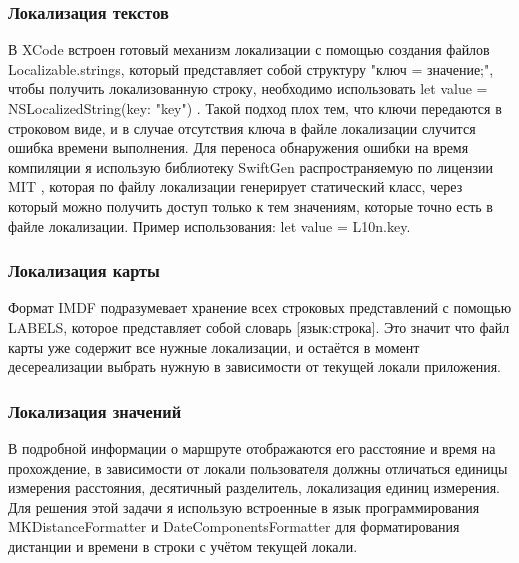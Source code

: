     \subsubsection{Локализация текстов}
      В XCode встроен готовый механизм локализации с помощью создания файлов Localizable.strings, который представляет собой структуру "ключ = значение;", чтобы получить локализованную строку, необходимо использовать let value = NSLocalizedString(key: "key") \cite{NSLocalizedString}. Такой подход плох тем, что ключи передаются в строковом виде, и в случае отсутствия ключа в файле локализации случится ошибка времени выполнения. Для переноса обнаружения ошибки на время компиляции я использую библиотеку SwiftGen \cite{SwiftGen} распространяемую по лицензии MIT \cite{MIT}, которая по файлу локализации генерирует статический класс, через который можно получить доступ только к тем значениям, которые точно есть в файле локализации. Пример использования: let value = L10n.key.

    \subsubsection{Локализация карты}
      Формат IMDF подразумевает хранение всех строковых представлений с помощью LABELS, которое представляет собой словарь [язык:строка]. Это значит что файл карты уже содержит все нужные локализации, и остаётся в момент десереализации выбрать нужную в зависимости от текущей локали приложения.

    \subsubsection{Локализация значений}
      В подробной информации о маршруте отображаются его расстояние и время на прохождение, в зависимости от локали пользователя должны отличаться единицы измерения расстояния, десятичный разделитель, локализация единиц измерения. Для решения этой задачи я использую встроенные в язык программирования MKDistanceFormatter \cite{MKDistanceFormatter} и DateComponentsFormatter \cite{DateComponentsFormatter} для форматирования дистанции и времени в строки с учётом текущей локали.

